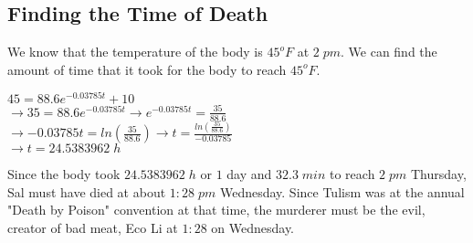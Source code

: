 \documentclass{article}
\begin{document}
	\subsection{Finding the Time of Death}
	We know that the temperature of the body is $45^oF$ at $2\;pm$. We can find the amount of time that it took for the body to reach $45^oF$.
	\begin{center}
		$45 = 88.6e^{-0.03785t}+10$ \\
		$\rightarrow 35 = 88.6e^{-0.03785t} \rightarrow e^{-0.03785t} = \frac{35}{88.6}$ \\
		$\rightarrow -0.03785t = ln(\frac{35}{88.6}) \rightarrow t = \frac{ln(\frac{35}{88.6})}{-0.03785}$\\
		$\rightarrow t = 24.5383962\;h$
	\end{center}
	Since the body took $24.5383962\;h$ or $1$ day and $32.3\;min$ to reach $2\;pm$ Thursday, Sal must have died at about $1:28\;pm$ Wednesday. Since Tulism was at the annual "Death by Poison" convention at that time, the murderer must be the evil, creator of bad meat, Eco Li at $1:28$ on Wednesday. 
\end{document}
